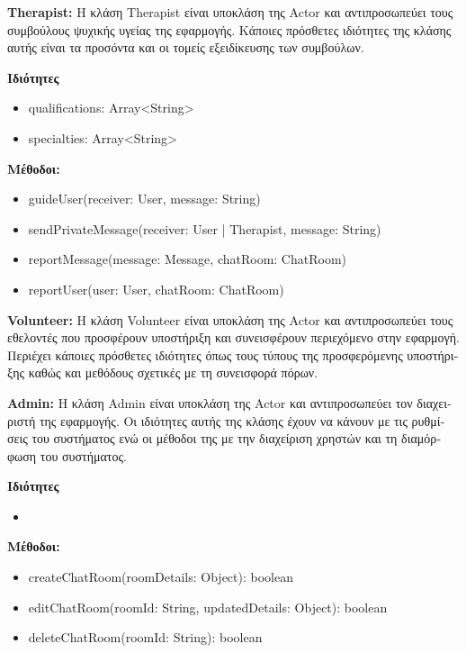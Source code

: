 \documentclass{article}
\begin{document}
\textbf{Therapist:} \textgreek{Η κλάση} Therapist \textgreek{είναι υποκλάση της} Actor \textgreek{και αντιπροσωπεύει τους συμβούλους ψυχικής υγείας της εφαρμογής. Κάποιες πρόσθετες ιδιότητες της κλάσης αυτής είναι τα προσόντα και οι τομείς εξειδίκευσης των συμβούλων.}
\newline
\newline

\textbf{\textgreek{Ιδιότητες}}
\begin{itemize}
    \item qualifications: Array<String>
    \item specialties: Array<String>
\end{itemize}
\textbf{\textgreek{Μέθοδοι:}}
\begin{itemize}
    \item guideUser(receiver: User, message: String)
    \item sendPrivateMessage(receiver: User | Therapist, message: String)
    \item reportMessage(message: Message, chatRoom: ChatRoom)
    \item reportUser(user: User, chatRoom: ChatRoom)
\end{itemize}

\textbf{Volunteer:} \textgreek{Η κλάση} Volunteer \textgreek{είναι υποκλάση της} Actor \textgreek{και αντιπροσωπεύει τους εθελοντές που προσφέρουν υποστήριξη και συνεισφέρουν περιεχόμενο στην εφαρμογή. Περιέχει κάποιες πρόσθετες ιδιότητες όπως τους τύπους της προσφερόμενης υποστήριξης καθώς και μεθόδους σχετικές με τη συνεισφορά πόρων.}
\newline
\newline

\textbf{Admin:} \textgreek{Η κλάση} Admin \textgreek{είναι υποκλάση της} Actor \textgreek{και αντιπροσωπεύει τον διαχειριστή της εφαρμογής. Οι ιδιότητες αυτής της κλάσης έχουν να κάνουν με τις ρυθμίσεις του συστήματος ενώ οι μέθοδοι της με την διαχείριση χρηστών και τη διαμόρφωση του συστήματος.}
\newline
\newline

\textbf{\textgreek{Ιδιότητες}}
\begin{itemize}
    \item
\end{itemize}
\textbf{\textgreek{Μέθοδοι:}}
\begin{itemize}
    \item createChatRoom(roomDetails: Object): boolean
    \item editChatRoom(roomId: String, updatedDetails: Object): boolean
    \item deleteChatRoom(roomId: String): boolean
\end{itemize}
\end{document}
